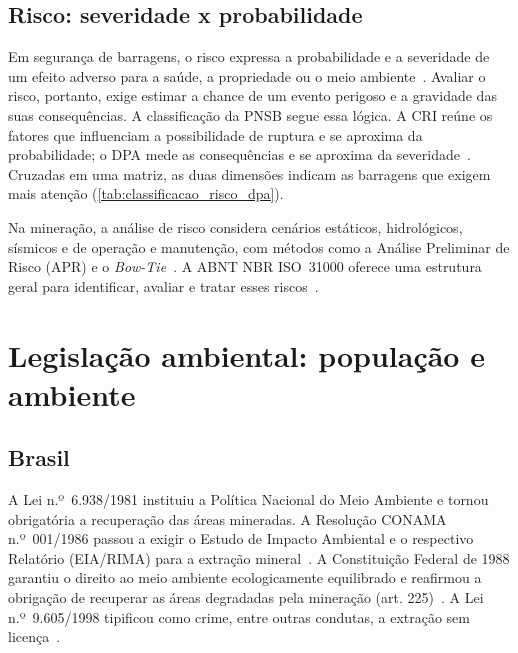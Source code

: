 \subsection{Risco: severidade x probabilidade}
\label{subsec:risco}

Em segurança de barragens, o risco expressa a probabilidade e a
severidade de um efeito adverso para a saúde, a propriedade ou o meio
ambiente~\cite[p.~17]{mi2002manual}. Avaliar o risco, portanto, exige
estimar a chance de um evento perigoso e a gravidade das suas
consequências.
A classificação da PNSB segue essa lógica. A CRI reúne os fatores que
influenciam a possibilidade de ruptura e se aproxima da probabilidade;
o DPA mede as consequências e se aproxima da severidade~\cite{brasil2010pnsb}. Cruzadas em uma matriz, as duas dimensões
indicam as barragens que exigem mais atenção
(\autoref{tab:classificacao_risco_dpa}).

Na mineração, a análise de risco considera cenários estáticos,
hidrológicos, sísmicos e de operação e manutenção, com métodos como a
Análise Preliminar de Risco (APR) e o \textit{Bow-Tie}~\cite{conceicao2018, vilaca2021}.
A ABNT NBR ISO~31000 oferece uma estrutura geral para identificar,
avaliar e tratar esses riscos~\cite{cruz2024iso}.

\section{Legislação ambiental: população e ambiente}
\label{sec:legislacao}

\subsection{Brasil}
\label{subsec:legislacao_brasil}

A Lei n.º~6.938/1981 instituiu a Política Nacional do Meio Ambiente e
tornou obrigatória a recuperação das áreas mineradas. A Resolução
CONAMA n.º~001/1986 passou a exigir o Estudo de Impacto Ambiental e o
respectivo Relatório (EIA/RIMA) para a extração mineral~\cite{barros2017legislacao, conama1986resolucao001}.
A Constituição Federal de 1988 garantiu o direito ao meio ambiente
ecologicamente equilibrado e reafirmou a obrigação de recuperar as áreas
degradadas pela mineração (art. 225)~\cite{brasil1988constituicao}. A
Lei n.º~9.605/1998 tipificou como crime, entre outras condutas, a
extração sem licença~\cite{brasil1998lei9605}.

